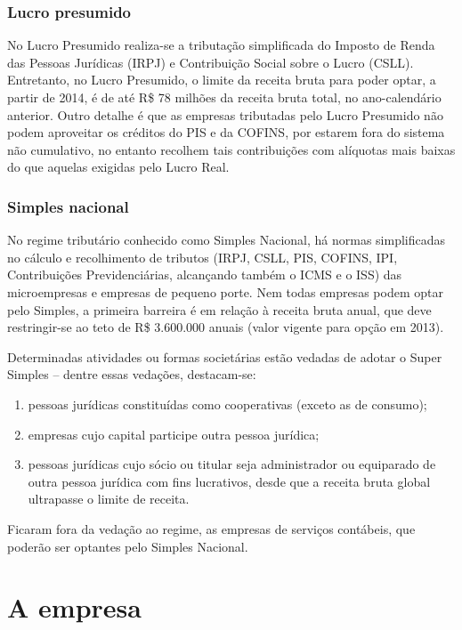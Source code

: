 \documentclass[
	12pt,				%
	openright,			%
	oneside,			%
	a4paper,			%
	english,			%
	french,				%
	spanish,			%
	brazil				%
	]{abntex2}
\begin{document}
\subsection{Lucro presumido}

	No Lucro Presumido realiza-se a tributação simplificada do Imposto de Renda das Pessoas Jurídicas (IRPJ) e Contribuição Social sobre o Lucro (CSLL). Entretanto, no Lucro Presumido, o limite da receita bruta para poder optar, a partir de 2014, é de até R\$ 78 milhões da receita bruta total, no ano-calendário anterior. Outro detalhe é que as empresas tributadas pelo Lucro Presumido não podem aproveitar os créditos do PIS e da COFINS, por estarem fora do sistema não cumulativo, no entanto recolhem tais contribuições com alíquotas mais baixas do que aquelas exigidas pelo Lucro Real.

\subsection{Simples nacional}

	No regime tributário conhecido como Simples Nacional, há normas simplificadas no cálculo e recolhimento de tributos (IRPJ, CSLL, PIS, COFINS, IPI, Contribuições Previdenciárias, alcançando também o ICMS e o ISS) das microempresas e empresas de pequeno porte. Nem todas empresas podem optar pelo Simples, a primeira barreira é em relação à receita bruta anual, que deve restringir-se ao teto de R\$ 3.600.000 anuais (valor vigente para opção em 2013). 
	
Determinadas atividades ou formas societárias estão vedadas de adotar o Super Simples – dentre essas vedações, destacam-se:
	\begin{enumerate}
		\item pessoas jurídicas constituídas como cooperativas (exceto as de consumo);
		\item empresas cujo capital participe outra pessoa jurídica;
		\item pessoas jurídicas cujo sócio ou titular seja administrador ou equiparado de outra pessoa jurídica com fins lucrativos, desde que a receita bruta global ultrapasse o limite de receita.
	\end{enumerate}

Ficaram fora da vedação ao regime, as empresas de serviços contábeis, que poderão ser optantes pelo Simples Nacional.

\chapter[A empresa]{A empresa}
\end{document}
